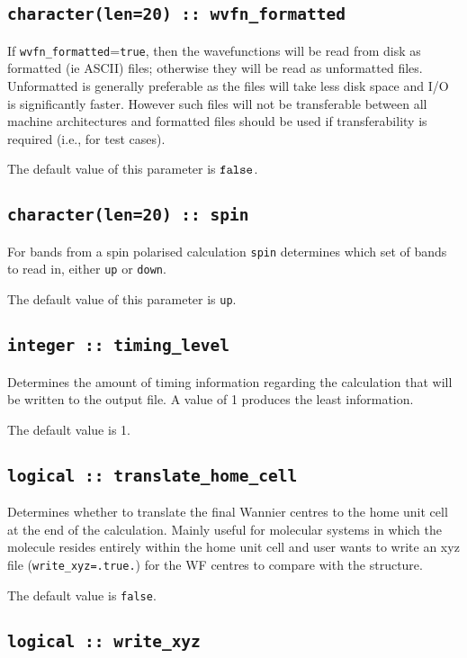 \subsection[wvfn\_formated]{\tt character(len=20) :: wvfn\_formatted}

If \verb#wvfn_formatted#=\verb#true#, then the wavefunctions will be
read from disk as formatted (ie ASCII) files; otherwise they will be
read as unformatted files. Unformatted is generally preferable as the
files will take less disk space and I/O is significantly
faster. However such files will not be transferable between all
machine architectures and formatted files should be used if
transferability is required (i.e., for test cases).

The default value of this parameter is $\verb#false#$.


\subsection[spin]{\tt character(len=20) :: spin}
For bands from a spin polarised calculation {\tt spin} determines which set
of bands to read in, either \verb#up# or \verb#down#.

The default value of this parameter is \verb#up#.


\subsection[timing\_level]{\tt integer :: timing\_level}

Determines the amount of timing information regarding the calculation
that will be written to the output file. A value of 1 produces the
least information. 

The default value is 1.

\subsection[translate\_home\_cell]{\tt logical :: translate\_home\_cell}

Determines whether to translate the final Wannier centres to the home
unit cell at the end of the calculation. Mainly useful for molecular
systems in which the molecule resides entirely within the home unit 
cell and user wants to write an xyz file ({\tt write\_xyz=.true.}) for
the WF centres to compare with the structure. 

The default value is \verb#false#. 

\subsection[write\_xyz]{\tt logical :: write\_xyz}

